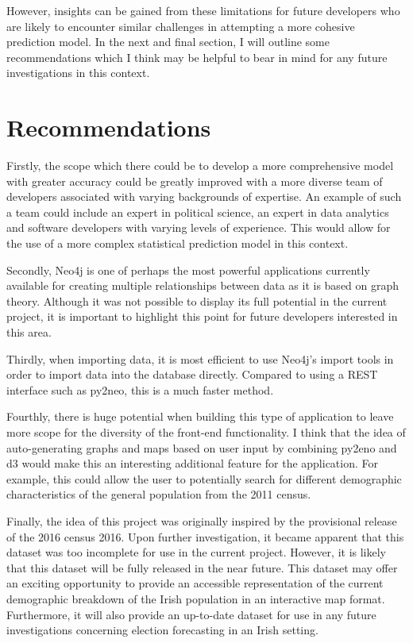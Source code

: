 However, insights can be gained from these limitations for future developers who are likely to encounter similar challenges in attempting a more cohesive prediction model. In the next and final section, I will outline some recommendations which I think may be helpful to bear in mind for any future investigations in this context.

\section{Recommendations}
Firstly, the scope which there could be to develop a more comprehensive model with greater accuracy could be greatly improved with a more diverse team of developers associated with varying backgrounds of expertise. An example of such a team could include an expert in political science, an expert in data analytics and software developers with varying levels of experience. This would allow for the use of a more complex statistical prediction model in this context.

Secondly, Neo4j is one of perhaps the most powerful applications currently available for creating multiple relationships between data as it is based on graph theory. Although it was not possible to display its full potential in the current project, it is important to highlight this point for future developers interested in this area. 

Thirdly, when importing data, it is most efficient to use Neo4j’s import tools in order to import data into the database directly. Compared to using a REST interface such as py2neo, this is a much faster method.

Fourthly, there is huge potential when building this type of application to leave more scope for the diversity of the front-end functionality. I think that the idea of auto-generating graphs and maps based on user input by combining py2eno and d3 would make this an interesting additional feature for the application. For example, this could allow the user to potentially search for different demographic characteristics of the general population from the 2011 census.

Finally, the idea of this project was originally inspired by the provisional release of the 2016 census 2016. Upon further investigation, it became apparent that this dataset was too incomplete for use in the current project. However, it is likely that this dataset will be fully released in the near future. This dataset may offer an exciting opportunity to provide an accessible representation of the current demographic breakdown of the Irish population in an interactive map format. Furthermore, it will also provide an up-to-date dataset for use in any future investigations concerning election forecasting in an Irish setting. 
